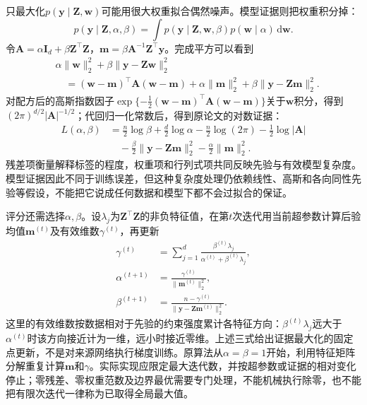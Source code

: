 只最大化$p(\bm y\mid\bm Z,\bm w)$可能用很大权重拟合偶然噪声。模型证据则把权重积分掉：
\begin{equation}
  p(\bm y\mid\bm Z,\alpha,\beta)
  =\int p(\bm y\mid\bm Z,\bm w,\beta)
       p(\bm w\mid\alpha)\,\mathrm d\bm w.
  \label{eq:ket-reuse-logme-evidence}
\end{equation}
令$\bm A=\alpha\bm I_d+\beta\bm Z^\top\bm Z$，$\bm m=\beta\bm A^{-1}\bm Z^\top\bm y$。完成平方可以看到
\[
  \begin{aligned}
    &\alpha\lVert\bm w\rVert_2^2+
      \beta\lVert\bm y-\bm Z\bm w\rVert_2^2\\
    &\quad=(\bm w-\bm m)^\top\bm A(\bm w-\bm m)
       +\alpha\lVert\bm m\rVert_2^2
       +\beta\lVert\bm y-\bm Z\bm m\rVert_2^2.
  \end{aligned}
\]
对配方后的高斯指数因子$\exp\{-\tfrac12(\bm w-\bm m)^\top\bm A(\bm w-\bm m)\}$关于$\bm w$积分，得到$(2\pi)^{d/2}|\bm A|^{-1/2}$；代回归一化常数后，得到原论文的对数证据：
\begin{equation}
  \begin{aligned}
    L(\alpha,\beta)
    &=\frac n2\log\beta+\frac d2\log\alpha
       -\frac n2\log(2\pi)-\frac12\log|\bm A|\\
    &\quad-\frac\beta2\lVert\bm y-\bm Z\bm m\rVert_2^2
       -\frac\alpha2\lVert\bm m\rVert_2^2.
  \end{aligned}
  \label{eq:ket-reuse-logme-log-evidence}
\end{equation}
残差项衡量解释标签的程度，权重项和行列式项共同反映先验与有效模型复杂度。模型证据因此不同于训练误差，但这种复杂度处理仍依赖线性、高斯和各向同性先验等假设，不能把它说成任何数据和模型下都不会过拟合的保证。

评分还需选择$\alpha,\beta$。设$\lambda_j$为$\bm Z^\top\bm Z$的非负特征值，在第$t$次迭代用当前超参数计算后验均值$\bm m^{(t)}$及有效维数$\gamma^{(t)}$，再更新
\begin{equation}
  \begin{aligned}
    \gamma^{(t)}&=\sum_{j=1}^{d}
       \frac{\beta^{(t)}\lambda_j}{\alpha^{(t)}+\beta^{(t)}\lambda_j},\\
    \alpha^{(t+1)}&=
       \frac{\gamma^{(t)}}{\lVert\bm m^{(t)}\rVert_2^2},\\
    \beta^{(t+1)}&=
       \frac{n-\gamma^{(t)}}{\lVert\bm y-\bm Z\bm m^{(t)}\rVert_2^2}.
  \end{aligned}
  \label{eq:ket-reuse-logme-update}
\end{equation}
这里的有效维数按数据相对于先验的约束强度累计各特征方向：$\beta^{(t)}\lambda_j$远大于$\alpha^{(t)}$时该方向接近计为一维，远小时接近零维。上述三式给出证据最大化的固定点更新，不是对来源网络执行梯度训练。原算法从$\alpha=\beta=1$开始，利用特征矩阵分解重复计算$\bm m$和$\gamma$。实际实现应限定最大迭代数，并按超参数或证据的相对变化停止；零残差、零权重范数及边界最优需要专门处理，不能机械执行除零，也不能把有限次迭代一律称为已取得全局最大值。

